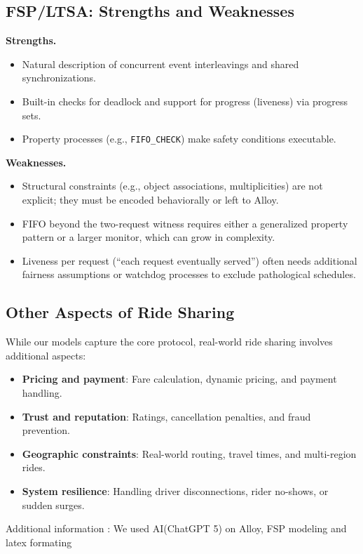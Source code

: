 \documentclass[11pt]{article}
\begin{document}
\subsection{FSP/LTSA: Strengths and Weaknesses}

\textbf{Strengths.}
\begin{itemize}[leftmargin=1.5em]
  \item Natural description of concurrent event interleavings and shared synchronizations.
  \item Built-in checks for deadlock and support for progress (liveness) via progress sets.
  \item Property processes (e.g., \texttt{FIFO\_CHECK}) make safety conditions executable.
\end{itemize}
\textbf{Weaknesses.}
\begin{itemize}[leftmargin=1.5em]
  \item Structural constraints (e.g., object associations, multiplicities) are not explicit; they must be encoded behaviorally or left to Alloy.
  \item FIFO beyond the two-request witness requires either a generalized property pattern or a larger monitor, which can grow in complexity.
  \item Liveness per request (``each request eventually served'') often needs additional fairness assumptions or watchdog processes to exclude pathological schedules.
\end{itemize}

\subsection{Other Aspects of Ride Sharing}

While our models capture the core protocol, real-world ride sharing involves additional aspects:
\begin{itemize}[leftmargin=1.5em]
  \item \textbf{Pricing and payment}: Fare calculation, dynamic pricing, and payment handling.
  \item \textbf{Trust and reputation}: Ratings, cancellation penalties, and fraud prevention.
  \item \textbf{Geographic constraints}: Real-world routing, travel times, and multi-region rides.
  \item \textbf{System resilience}: Handling driver disconnections, rider no-shows, or sudden surges.
\end{itemize}
\noindent Additional information : We used AI(ChatGPT 5) on Alloy, FSP modeling and latex formating
\end{document}
